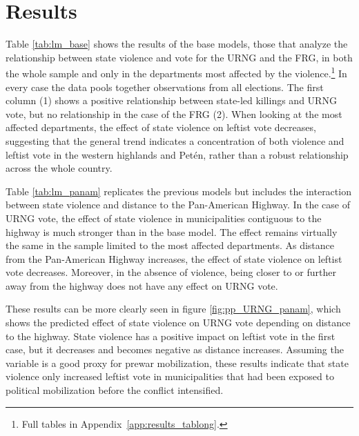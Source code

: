 \documentclass[12pt, notitlepage]{article}
\begin{document}
\section*{Results}

Table \ref{tab:lm_base} shows the results of the base models, those that analyze the relationship between state violence and vote for the URNG and the FRG, in both the whole sample and only in the departments most affected by the violence.\footnote{Full tables in Appendix~\ref{app:results_tablong}.}
In every case the data pools together observations from all elections.
The first column (1) shows a positive relationship between state-led killings and URNG vote, but no relationship in the case of the FRG (2).
When looking at the most affected departments, the effect of state violence on leftist vote decreases, suggesting that the general trend indicates a concentration of both violence and leftist vote in the western highlands and Petén, rather than a robust relationship across the whole country.



Table \ref{tab:lm_panam} replicates the previous models but includes the interaction between state violence and distance to the Pan-American Highway.
In the case of URNG vote, the effect of state violence in municipalities contiguous to the highway is much stronger than in the base model.
The effect remains virtually the same in the sample limited to the most affected departments.
As distance from the Pan-American Highway increases, the effect of state violence on leftist vote decreases.
Moreover, in the absence of violence, being closer to or further away from the highway does not have any effect on URNG vote.



These results can be more clearly seen in figure \ref{fig:pp_URNG_panam}, which shows the predicted effect of state violence on URNG vote depending on distance to the highway.
State violence has a positive impact on leftist vote in the first case, but it decreases and becomes negative as distance increases.
Assuming the variable is a good proxy for prewar mobilization, these results indicate that state violence only increased leftist vote in municipalities that had been exposed to political mobilization before the conflict intensified.
\end{document}
